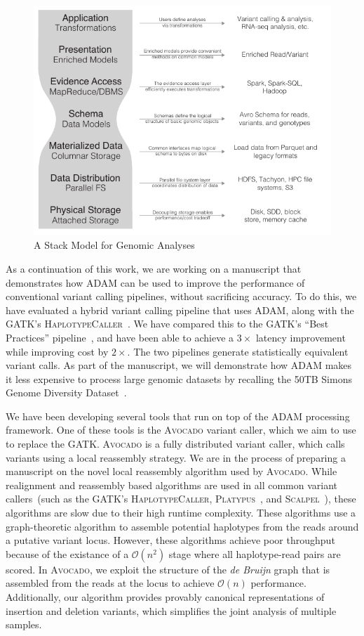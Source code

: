 \documentclass[11pt]{article} %
\begin{document}
\begin{figure}[h]
\begin{center}
\includegraphics[width=0.6\linewidth]{../ms-thesis/expanded-stack-2.pdf}
\end{center}
\caption{A Stack Model for Genomic Analyses}
\label{fig:stack-model}
\end{figure}

As a continuation of this work, we are working on a manuscript that demonstrates how \textsc{ADAM}
can be used to improve the performance of conventional variant calling pipelines, without
sacrificing accuracy. To do this, we have evaluated a hybrid variant calling pipeline that uses
\textsc{ADAM}, along with the \textsc{GATK}'s \textsc{HaplotypeCaller}~\cite{depristo11}. We
have compared this to the \textsc{GATK}'s ``Best Practices'' pipeline~\cite{auwera13}, and have
been able to achieve a $3\times$ latency improvement while improving cost by $2\times$. The
two pipelines generate statistically equivalent variant calls. As part of the manuscript, we
will demonstrate how \textsc{ADAM} makes it less expensive to process large genomic datasets
by recalling the 50TB Simons Genome Diversity Dataset~\cite{simons}.

We have been developing several tools that run on top of the \textsc{ADAM} processing framework.
One of these tools is the \textsc{Avocado} variant caller, which we aim to use to replace the
\textsc{GATK}. \textsc{Avocado} is a fully distributed variant caller, which calls variants using
a local reassembly strategy. We are in the process of preparing a manuscript on the novel local
reassembly algorithm used by \textsc{Avocado}. While realignment and reassembly based algorithms
are used in all common variant callers~(such as the \textsc{GATK}'s \textsc{HaplotypeCaller},
\textsc{Platypus}~\cite{rimmer14}, and \textsc{Scalpel}~\cite{narzisi14}), these algorithms are
slow due to their high runtime complexity. These algorithms use a graph-theoretic algorithm to
assemble potential haplotypes from the reads around a putative variant locus. However, these
algorithms achieve poor throughput because of the existance of a $\mathcal{O}(n^2)$ stage
where all haplotype-read pairs are scored. In \textsc{Avocado}, we exploit the structure of the
\emph{de Bruijn} graph that is assembled from the reads at the locus to achieve $\mathcal{O}(n)$
performance. Additionally, our algorithm provides provably canonical representations of insertion
and deletion variants, which simplifies the joint analysis of multiple samples.
\end{document}
